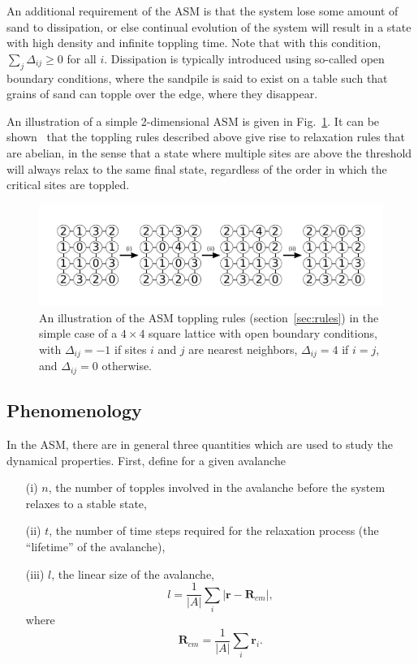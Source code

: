 \documentclass[aps,prb,reprint,superscriptaddress]{revtex4-2}
\begin{document}
An additional requirement of the ASM is that the system lose some amount of sand to dissipation, or else continual evolution of the system will result in a state with high density and infinite toppling time. Note that with this condition, $\sum_j\Delta_{ij} \geq 0$ for all $i$. Dissipation is typically introduced using so-called open boundary conditions, where the sandpile is said to exist on a table such that grains of sand can topple over the edge, where they disappear.

An illustration of a simple 2-dimensional ASM is given in Fig.~\ref{fig:rules}. It can be shown~\cite{dhar_self-organized_1990} that the toppling rules described above give rise to relaxation rules that are abelian, in the sense that a state where multiple sites are above the threshold will always relax to the same final state, regardless of the order in which the critical sites are toppled.

\begin{figure}
\includegraphics{rules}
\caption{\label{fig:rules} An illustration of the ASM toppling rules (section~\ref{sec:rules}) in the simple case of a $4 \times 4$ square lattice with open boundary conditions, with $\Delta_{ij} = -1$ if sites $i$ and $j$ are nearest neighbors, $\Delta_{ij} = 4$ if $i = j$, and $\Delta_{ij} = 0$ otherwise.}
\end{figure}

\subsection{Phenomenology}

In the ASM, there are in general three quantities which are used to study the dynamical properties. First, define for a given avalanche

\begin{enumerate}
\item[(i)] $n$, the number of topples involved in the avalanche before the system relaxes to a stable state,
\item[(ii)] $t$, the number of time steps required for the relaxation process (the ``lifetime'' of the avalanche),
\item[(iii)] $l$, the linear size of the avalanche, 
\[
l = \dfrac{1}{|A|}\sum_i|\bm{r}-\bm{R}_{cm}|,
\]
where
\[
\bm{R}_{cm} = \dfrac{1}{|A|}\sum_i\bm{r}_i.
\]
\end{enumerate}
\end{document}
